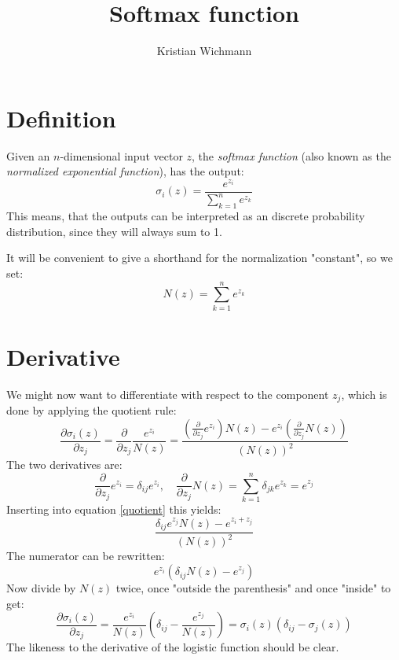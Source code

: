 \documentclass[12pt, a4paper]{article}
\title{Softmax function}
\author{Kristian Wichmann}
\numberwithin{equation}{section}
\begin{document}
\maketitle

\section{Definition}
Given an $n$-dimensional input vector $z$, the \textit{softmax function} (also known as the \textit{normalized exponential function}), has the output:
\begin{equation}
\sigma_i(z)=\frac{e^{z_i}}{\sum_{k=1}^n e^{z_k}}
\end{equation}
This means, that the outputs can be interpreted as an discrete probability distribution, since they will always sum to 1.

It will be convenient to give a shorthand for the normalization "constant", so we set:
\begin{equation}
N(z)=\sum_{k=1}^n e^{z_k}
\end{equation}

\section{Derivative}
We might now want to differentiate with respect to the component $z_j$, which is done by applying the quotient rule:
\begin{equation}
\label{quotient}
\frac{\partial\sigma_i(z)}{\partial z_j}=\frac{\partial}{\partial z_j}\frac{e^{z_i}}{N(z)}=\frac{\left(\frac{\partial}{\partial z_j}e^{z_i}\right)N(z)-e^{z_i}\left(\frac{\partial}{\partial z_j}N(z)\right)}{(N(z))^2}
\end{equation}
The two derivatives are:
\begin{equation}
\frac{\partial}{\partial z_j}e^{z_i}=\delta_{ij}e^{z_i},\quad\frac{\partial}{\partial z_j}N(z)=\sum_{k=1}^n\delta_{jk}e^{z_k}=e^{z_j}
\end{equation}
Inserting into equation \ref{quotient} this yields:
\begin{equation}
\frac{\delta_{ij}e^{z_j}N(z)-e^{z_i+z_j}}{(N(z))^2}
\end{equation}
The numerator can be rewritten:
\begin{equation}
e^{z_i}\left(\delta_{ij}N(z)-e^{z_j}\right)
\end{equation}
Now divide by $N(z)$ twice, once "outside the parenthesis" and once "inside" to get:
\begin{equation}
\label{derivative}
\frac{\partial\sigma_i(z)}{\partial z_j}=\frac{e^{z_i}}{N(z)}\left(\delta_{ij}-\frac{e^{z_j}}{N(z)}\right)=\sigma_i(z)\left(\delta_{ij}-\sigma_j(z)\right)
\end{equation}
The likeness to the derivative of the logistic function should be clear.
\end{document}
